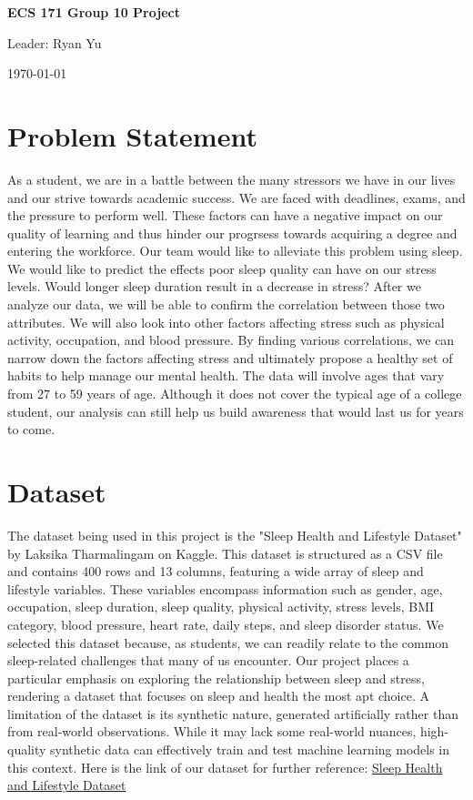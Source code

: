 \documentclass[11pt, letterpaper]{article}
\renewcommand{\maketitle}{
    \begin{titlepage}
        \centering
        \huge{\textbf{ECS 171 Group 10 Project}} \par
        \vspace{.5cm}
        \large{Leader: Ryan Yu} \par
        \vspace{.5cm}
        \normalfont{Amira Basyouni, Calvin Chen, Alexis Lydon, Tianming Tan} \par
        \vspace{.5cm}
        \today
    \end{titlepage}
}
\begin{document}
    \maketitle
    
    \newpage

    \section*{Problem Statement}
    As a student, we are in a battle between the many stressors we have in our lives 
    and our strive towards academic success. We are faced with deadlines, exams, and 
    the pressure to perform well. These factors can have a negative impact on our 
    quality of learning and thus hinder our progrsess towards acquiring a degree and 
    entering the workforce. Our team would like to alleviate this problem using sleep. 
    We would like to predict the effects poor sleep quality can have on our stress 
    levels. Would longer sleep duration result in a decrease in stress? After we 
    analyze our data, we will be able to confirm the correlation between those two 
    attributes. We will also look into other factors affecting stress such as physical 
    activity, occupation, and blood pressure. By finding various correlations, we can 
    narrow down the factors affecting stress and ultimately propose a healthy set of 
    habits to help manage our mental health. The data will involve ages that vary from 
    27 to 59 years of age. Although it does not cover the typical age of a college 
    student, our analysis can still help us build awareness that would last us for 
    years to come.

    \section*{Dataset}
    The dataset being used in this project is the "Sleep Health and Lifestyle Dataset" 
    by Laksika Tharmalingam on Kaggle. This dataset is structured as a CSV file and contains 
    400 rows and 13 columns, featuring a wide array of sleep and lifestyle variables. These variables 
    encompass information such as gender, age, occupation, sleep duration, sleep quality, physical 
    activity, stress levels, BMI category, blood pressure, heart rate, daily steps, and sleep disorder 
    status. We selected this dataset because, as students, we can readily relate to the common sleep-related 
    challenges that many of us encounter. Our project places a particular emphasis on exploring the relationship 
    between sleep and stress, rendering a dataset that focuses on sleep and health the most apt choice. A limitation 
    of the dataset is its synthetic nature, generated artificially rather than 
    from real-world observations. While it may lack some real-world nuances, high-quality synthetic data can 
    effectively train and test machine learning models in this context. Here is the link
    of our dataset for further reference: \href{https://www.kaggle.com/datasets/uom190346a/sleep-health-and-lifestyle-dataset/data}{Sleep Health and Lifestyle Dataset}
\end{document}
